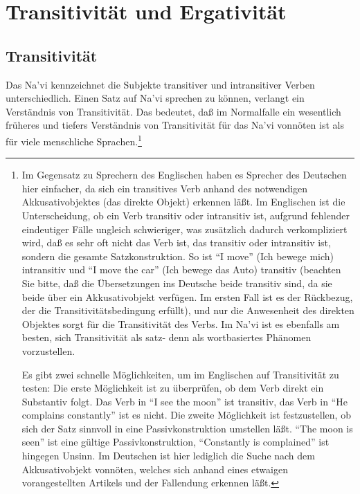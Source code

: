 
\section{Transitivit\"at und Ergativit\"at}

\subsection{Transitivit\"at} Das Na’vi kennzeichnet die Subjekte transitiver und
intransitiver Verben unterschiedlich. Einen Satz auf Na’vi sprechen zu k\"onnen,
verlangt ein Verst\"andnis von Transitivit\"at. Das bedeutet, da\ss{} im Normalfalle
ein wesentlich fr\"uheres und tiefers Verst\"andnis von Transitivit\"at f\"ur das Na’vi
vonn\"oten ist als f\"ur viele menschliche Sprachen.\footnote{Im Gegensatz zu Sprechern
des Englischen haben es Sprecher des Deutschen hier einfacher, da sich ein transitives
Verb anhand des notwendigen Akkusativobjektes (das direkte Objekt) erkennen l\"a\ss{}t.
Im Englischen ist die Unterscheidung, ob ein Verb transitiv oder intransitiv ist,
aufgrund fehlender eindeutiger F\"alle ungleich schwieriger, was zus\"atzlich dadurch
verkompliziert wird, da\ss{} es sehr oft nicht das Verb ist, das transitiv oder
intransitiv ist, sondern die gesamte Satzkonstruktion. So ist "`I move"' (Ich bewege
mich) intransitiv und "`I move the car"' (Ich bewege das Auto) transitiv (beachten
Sie bitte, da\ss{} die \"Ubersetzungen ins Deutsche beide transitiv sind, da sie beide
\"uber ein Akkusativobjekt verf\"ugen. Im ersten Fall ist es der R\"uckbezug, der die
Transitivit\"atsbedingung erf\"ullt), und nur die Anwesenheit des direkten Objektes
sorgt f\"ur die Transitivit\"at des Verbs. Im Na’vi ist es ebenfalls am besten, sich
Transitivit\"at als satz- denn als wortbasiertes Ph\"anomen vorzustellen.

Es gibt zwei schnelle M\"oglichkeiten, um im Englischen auf Transitivit\"at zu testen:
Die erste M\"oglichkeit ist zu \"uberpr\"ufen, ob dem Verb direkt ein Substantiv folgt.
Das Verb in "`I see the moon"' ist transitiv, das Verb in "`He complains constantly"'
ist es nicht. Die zweite M\"oglichkeit ist festzustellen, ob sich der Satz sinnvoll
in eine Passivkonstruktion umstellen l\"a\ss{}t. "`The moon is seen"' ist eine
g\"ultige Passivkonstruktion, "`Constantly is complained"' ist hingegen Unsinn.
Im Deutschen ist hier lediglich die Suche nach dem Akkusativobjekt vonn\"oten, welches
sich anhand eines etwaigen vorangestellten Artikels und der Fallendung erkennen
l\"a\ss{}t.}

